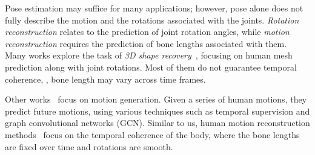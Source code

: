 Pose estimation may suffice for many applications; however, pose alone does not fully describe the motion and the rotations associated with the joints. \emph{Rotation reconstruction} relates to the prediction of joint rotation angles, while \emph{motion reconstruction} requires the prediction of bone lengths associated with them.
%
Many works explore the task of \emph{3D shape recovery}~\cite{SMPL:2015,Kanazawa:2018,Kolotouros:2019:ICCV,kocabas2020vibe,kissos2020weak,yoshiyasu2018skeleton,kanazawa2019learning,habermann2020deepcap,luo20203d,choi2021static}, focusing  on human mesh prediction along with joint rotations. Most of them do not guarantee temporal coherence, \eg, bone length may vary across time frames. 

Other works~\cite{pavllo2018quaternet,mao2020learning} 
focus on motion generation. Given a series of human motions, they predict future motions, using various techniques such as temporal supervision and graph convolutional networks (GCN).
Similar to us, human motion reconstruction methods~\cite{zhou2016deep,mehta2020xnect,shi2020motionet,video_motion_capture_cpm} focus on the temporal coherence of the body, where the bone lengths are fixed over time and rotations are smooth. 


